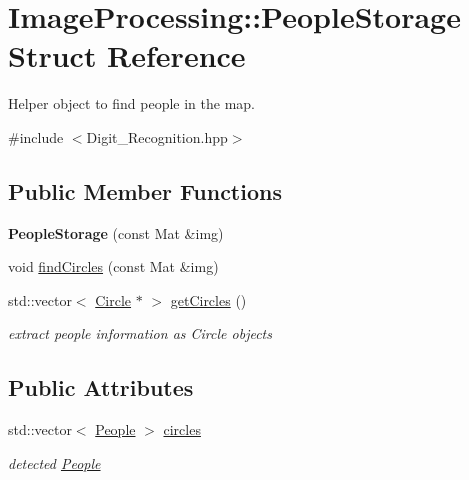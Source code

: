 \hypertarget{struct_image_processing_1_1_people_storage}{}\section{Image\+Processing\+:\+:People\+Storage Struct Reference}
\label{struct_image_processing_1_1_people_storage}


Helper object to find people in the map.  




{\ttfamily \#include $<$Digit\+\_\+\+Recognition.\+hpp$>$}

\subsection*{Public Member Functions}
\begin{DoxyCompactItemize}
\item 
\mbox{\label{struct_image_processing_1_1_people_storage_a5dce79322ec3418fbeed1f3140d7db81}} 
{\bfseries People\+Storage} (const Mat \&img)
\item 
void \mbox{\hyperlink{struct_image_processing_1_1_people_storage_a015359691478ed0b1f08e09b8dedc520}{find\+Circles}} (const Mat \&img)
\item 
\mbox{\label{struct_image_processing_1_1_people_storage_a1979743b2088d0dedb90e9ddee9153a3}} 
std\+::vector$<$ \mbox{\hyperlink{class_geometry2_d_1_1_circle}{Circle}} $\ast$ $>$ \mbox{\hyperlink{struct_image_processing_1_1_people_storage_a1979743b2088d0dedb90e9ddee9153a3}{get\+Circles}} ()
\begin{DoxyCompactList}\small\item\em extract people information as Circle objects \end{DoxyCompactList}\end{DoxyCompactItemize}
\subsection*{Public Attributes}
\begin{DoxyCompactItemize}
\item 
\mbox{\label{struct_image_processing_1_1_people_storage_a34d14ed3d729ca9dfe8dee8994fceee9}} 
std\+::vector$<$ \mbox{\hyperlink{class_people}{People}} $>$ \mbox{\hyperlink{struct_image_processing_1_1_people_storage_a34d14ed3d729ca9dfe8dee8994fceee9}{circles}}
\begin{DoxyCompactList}\small\item\em detected \mbox{\hyperlink{class_people}{People}} \end{DoxyCompactList}\end{DoxyCompactItemize}


